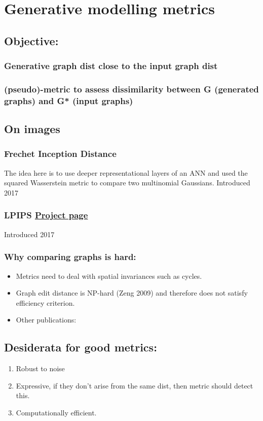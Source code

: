 \documentclass[12pt]{article}
\begin{document}
\section{Generative modelling metrics}
\label{sec:org18f08a7}
\subsection{Objective:}
\label{sec:org80c6c46}
\subsubsection{Generative graph dist close to the input graph dist}
\label{sec:orgbcd2db5}
\subsubsection{(pseudo)-metric to assess dissimilarity between G (generated graphs) and G* (input graphs)}
\label{sec:org3c2903f}
\subsection{On images}
\label{sec:org7b32362}
\subsubsection{Frechet Inception Distance}
\label{sec:org1441abc}
The idea here is to use deeper representational layers of an ANN and used the squared Wasserstein metric to compare two multinomial Gaussians.
Introduced 2017
\subsubsection{LPIPS \href{https://richzhang.github.io/PerceptualSimilarity/}{Project page}}
\label{sec:orgef55e67}
Introduced 2017
\subsubsection{Why comparing graphs is hard:}
\label{sec:org4228fdf}
\begin{itemize}
\item Metrics need to deal with spatial invariances such as cycles.
\item Graph edit distance is NP-hard (Zeng 2009) and therefore does not satisfy efficiency criterion.
\item Other publications:
\end{itemize}
\subsection{Desiderata for good metrics:}
\label{sec:org20cc667}
\begin{enumerate}
\item Robust to noise
\item Expressive, if they don't arise from the same dist, then metric should detect this.
\item Computationally efficient.
\end{enumerate}
\end{document}
